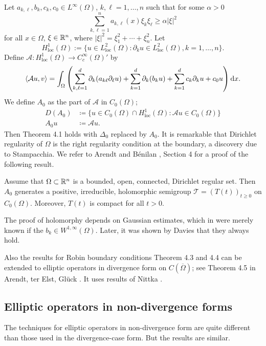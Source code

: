 Let $a_{k,\ell}, b_k, c_k, c_0 \in L^\infty(\Omega)$, $k, \ell = 1, \ldots, n$ such that for some $\alpha > 0$
\[
	\sum_{k,\ell=1}^n a_{k,\ell}(x)\xi_k\xi_\ell \geq \alpha|\xi|^2
\]
for all $x \in \Omega$, $\xi \in \mathbb{R}^n$, where $|\xi|^2 = \xi_1^2 + \cdots + \xi_n^2$.
Let 
%
\[
	H^1_{\text{loc}}(\Omega) := \{u \in L^2_{\text{loc}}(\Omega) \colon \partial_k u \in L^2_{\text{loc}}(\Omega), k = 1, \ldots, n\}.
\]
%
Define $\mathcal{A} \colon H^1_{\text{loc}}(\Omega) \to C_c^\infty(\Omega)'$ by
\[
	\langle \mathcal{A}u, v \rangle = \int_{\Omega}
		\left( \sum_{k,\ell=1}^d \partial_k(a_{k\ell}\partial_\ell u) + 
		\sum_{k=1}^d \partial_k(b_k u) + 
		\sum_{k=1}^d c_k \partial_k u + c_0 u \right) \mathop{}\!\mathrm{d}{x} .
\]
We define $A_0$ as the part of $\mathcal{A}$ in $C_0(\Omega)$; \ie
\begin{align*}
	D(A_0) &\coloneq \{u \in C_0(\Omega) \cap H^1_{\text{loc}}(\Omega) \colon \mathcal{A}u \in C_0(\Omega)\} \\
	A_0 u &\coloneq  \mathcal{A}u.
\end{align*}
Then Theorem 4.1 holds with $\Delta_0$ replaced by $A_0$. It is remarkable that Dirichlet regularity of $\Omega$ is the right regularity condition at the boundary, a discovery due to Stampacchia. We refer to Arendt and Bénilan \cite{ArBe99}, Section 4 for a proof of the following result.

\begin{theorem}
Assume that $\Omega \subset \mathbb{R}^n$ is a bounded, open, connected, Dirichlet regular set. Then $A_0$ generates a positive, irreducible, holomorphic semigroup $\mathcal{T} = (T(t))_{t \geq 0}$ on $C_0(\Omega)$. Moreover, $T(t)$ is compact for all $t > 0$.
\end{theorem}

\begin{remark*}
The proof of holomorphy depends on Gaussian estimates, which in \cite{ArBe99} were merely known if the $b_k \in W^{1,\infty}(\Omega)$. Later, it was shown by Davies \cite{Da00} that they always hold.
\end{remark*}

Also the results for Robin boundary conditions Theorem 4.3 and 4.4 can be extended to elliptic operators in divergence form on $C(\overline{\Omega})$; see Theorem 4.5 in Arendt, ter Elst, Glück \cite{AEG20}. It uses results of Nittka \cite{Ni11}.
\subsection{Elliptic operators in non-divergence forms}
The techniques for elliptic operators in non-divergence form are quite different than those used in the divergence-case form. But the results are similar.


